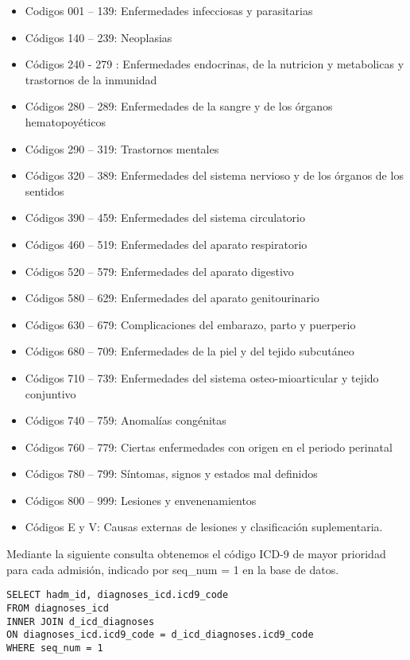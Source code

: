 \documentclass{report}
\begin{document}
\begin{itemize}
\item
  Codigos 001 -- 139: Enfermedades infecciosas y parasitarias
\item
  Códigos 140 -- 239: Neoplasias
\item
  Códigos 240 - 279 : Enfermedades endocrinas, de la nutricion y
  metabolicas y trastornos de la inmunidad
\item
  Códigos 280 -- 289: Enfermedades de la sangre y de los órganos
  hematopoyéticos
\item
  Códigos 290 -- 319: Trastornos mentales
\item
  Códigos 320 -- 389: Enfermedades del sistema nervioso y de los órganos
  de los sentidos
\item
  Códigos 390 -- 459: Enfermedades del sistema circulatorio
\item
  Códigos 460 -- 519: Enfermedades del aparato respiratorio
\item
  Códigos 520 -- 579: Enfermedades del aparato digestivo
\item
  Códigos 580 -- 629: Enfermedades del aparato genitourinario
\item
  Códigos 630 -- 679: Complicaciones del embarazo, parto y puerperio
\item
  Códigos 680 -- 709: Enfermedades de la piel y del tejido subcutáneo
\item
  Códigos 710 -- 739: Enfermedades del sistema osteo-mioarticular y
  tejido conjuntivo
\item
  Códigos 740 -- 759: Anomalías congénitas
\item
  Códigos 760 -- 779: Ciertas enfermedades con origen en el periodo
  perinatal
\item
  Códigos 780 -- 799: Síntomas, signos y estados mal definidos
\item
  Códigos 800 -- 999: Lesiones y envenenamientos
\item
  Códigos E y V: Causas externas de lesiones y clasificación
  suplementaria. 
\end{itemize}

Mediante la siguiente consulta obtenemos el código ICD-9 de mayor
prioridad para cada admisión, indicado por seq\_num = 1 en la base de datos.

\begin{verbatim}
SELECT hadm_id, diagnoses_icd.icd9_code
FROM diagnoses_icd  
INNER JOIN d_icd_diagnoses 
ON diagnoses_icd.icd9_code = d_icd_diagnoses.icd9_code 
WHERE seq_num = 1
\end{verbatim}
\end{document}
